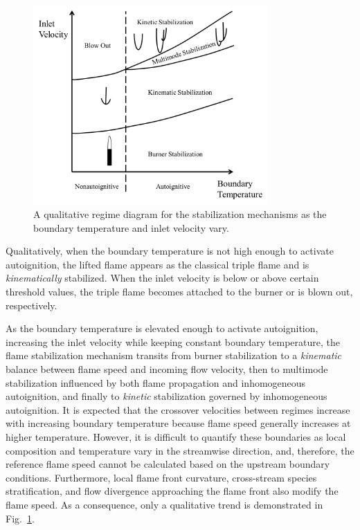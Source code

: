\begin{figure}
  \centering
  \scriptsize
  \includegraphics[width=0.8\textwidth]{ch-dynamics/2D-regime.png}
  \normalsize
  \caption{A qualitative regime diagram for the stabilization mechanisms as the boundary temperature and inlet velocity vary. }
  \label{fig:2D-regime}
\end{figure}

Qualitatively, when the boundary temperature is not high enough to activate autoignition, the lifted flame appears as the classical triple flame and is \emph{kinematically} stabilized.  When the inlet velocity is below or above certain threshold values, the triple flame becomes attached to the burner or is blown out, respectively.  

As the boundary temperature is elevated enough to activate autoignition, increasing the inlet velocity while keeping constant boundary temperature, the flame stabilization mechanism transits from burner stabilization to a \emph{kinematic} balance between flame speed and incoming flow velocity, then to multimode stabilization influenced by both flame propagation and inhomogeneous autoignition, and finally to \emph {kinetic} stabilization governed by inhomogeneous autoignition.  It is expected that the crossover velocities between regimes increase with increasing boundary temperature because flame speed generally increases at higher temperature.  However, it is difficult to quantify these boundaries as local composition and temperature vary in the streamwise direction, and, therefore, the reference flame speed cannot be calculated based on the upstream boundary conditions.  Furthermore, local flame front curvature, cross-stream species stratification, and flow divergence approaching the flame front also modify the flame speed.  As a consequence, only a qualitative trend is demonstrated in Fig.~\ref{fig:2D-regime}.  

